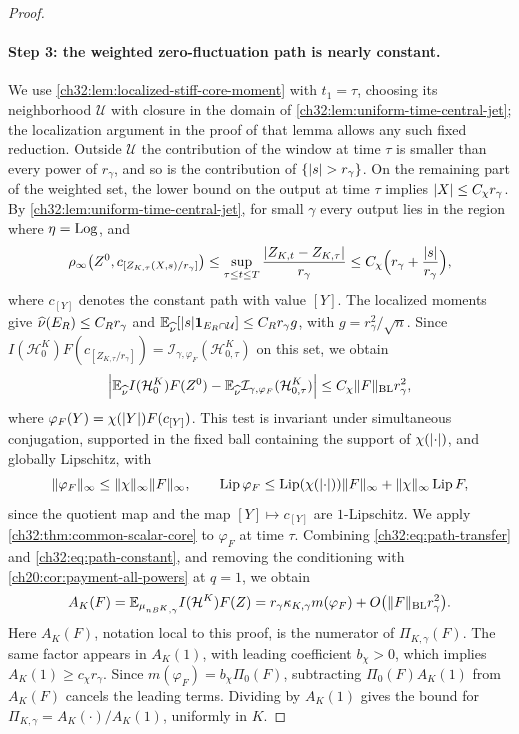 \begin{proof}
\paragraph{Step 3: the weighted zero-fluctuation path is nearly constant.}
We use \cref{ch32:lem:localized-stiff-core-moment} with $t_1=\tau$, choosing its neighborhood $\mathcal U$ with closure in the domain of \cref{ch32:lem:uniform-time-central-jet}; the localization argument in the proof of that lemma allows any such fixed reduction. Outside $\mathcal U$ the contribution of the window at time $\tau$ is smaller than every power of $r_\gamma$, and so is the contribution of $\{\lvert s\rvert>r_\gamma\}$. On the remaining part of the weighted set, the lower bound on the output at time $\tau$ implies $\lvert X\rvert\le C_\chi r_\gamma$. By \cref{ch32:lem:uniform-time-central-jet}, for small $\gamma$ every output lies in the region where $\eta=\operatorname{Log}$, and
\[
 \rho_\infty\bigl(Z^0,c_{[Z_{K,\tau}(X,s)/r_\gamma]}\bigr)\le\sup_{\tau\le t\le T}\frac{\lvert Z_{K,t}-Z_{K,\tau}\rvert}{r_\gamma}\le C_\chi\Bigl(r_\gamma+\frac{\lvert s\rvert}{r_\gamma}\Bigr),
\]
where $c_{[Y]}$ denotes the constant path with value $[Y]$. The localized moments give $\widehat\nu(E_R)\le C_Rr_\gamma$ and $\mathbb E_{\widehat\nu}[\lvert s\rvert\mathbf 1_{E_R\cap\mathcal U}]\le C_Rr_\gamma g$, with $g=r_\gamma^2/\sqrt n$. Since $I(\mathcal H^K_0)F(c_{[Z_{K,\tau}/r_\gamma]})=\mathcal I_{\gamma,\varphi_F}(\mathcal H^K_{0,\tau})$ on this set, we obtain
\begin{equation}\label{ch32:eq:path-constant}
 \Bigl\lvert\mathbb E_{\widehat\nu}I(\mathcal H^K_0)F(Z^0)-\mathbb E_{\widehat\nu}\mathcal I_{\gamma,\varphi_F}(\mathcal H^K_{0,\tau})\Bigr\rvert\le C_\chi\lVert F\rVert_{\mathrm{BL}}r_\gamma^2,
\end{equation}
where $\varphi_F(Y)=\chi(\lvert Y\rvert)F(c_{[Y]})$. This test is invariant under simultaneous conjugation, supported in the fixed ball containing the support of $\chi(\lvert \cdot\rvert)$, and globally Lipschitz, with
\[
 \lVert \varphi_F\rVert_\infty\le\lVert \chi\rVert_\infty\lVert F\rVert_\infty,\qquad\operatorname{Lip}\varphi_F\le\operatorname{Lip}(\chi(\lvert \cdot\rvert))\lVert F\rVert_\infty+\lVert \chi\rVert_\infty\operatorname{Lip} F,
\]
since the quotient map and the map $[Y]\mapsto c_{[Y]}$ are $1$-Lipschitz. We apply \cref{ch32:thm:common-scalar-core} to $\varphi_F$ at time $\tau$. Combining \eqref{ch32:eq:path-transfer} and \eqref{ch32:eq:path-constant}, and removing the conditioning with \cref{ch20:cor:payment-all-powers} at $q=1$, we obtain
\begin{equation}\label{ch32:eq:path-finite}
 A_K(F)=\mathbb E_{\mu_{nB^K,\gamma}}I(\mathcal H^K)F(Z)=r_\gamma\kappa_{K,\gamma}m(\varphi_F)+O\bigl(\lVert F\rVert_{\mathrm{BL}}r_\gamma^2\bigr).
\end{equation}
Here $A_K(F)$, notation local to this proof, is the numerator of $\Pi_{K,\gamma}(F)$. The same factor appears in $A_K(1)$, with leading coefficient $b_\chi>0$, which implies $A_K(1)\ge c_\chi r_\gamma$. Since $m(\varphi_F)=b_\chi\Pi_0(F)$, subtracting $\Pi_0(F)A_K(1)$ from $A_K(F)$ cancels the leading terms. Dividing by $A_K(1)$ gives the bound for $\Pi_{K,\gamma}=A_K(\cdot)/A_K(1)$, uniformly in $K$.


\end{proof}
